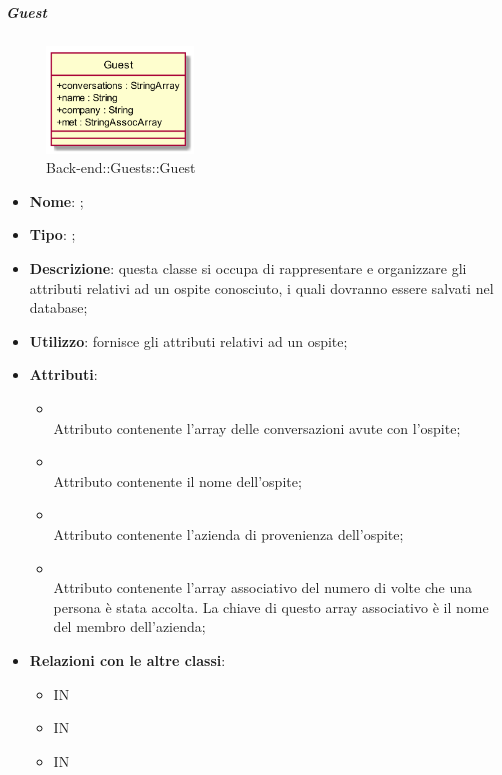 \hypertarget{Guest_label}{\subparagraph{Guest}}
\begin{figure}[h]
	\centering
	\includegraphics[width=0.35\textwidth,height=\textheight,keepaspectratio]{images/ClassGuest.png}
	\caption{Back-end::Guests::Guest}
\end{figure}
\begin{itemize}
	\item \textbf{Nome}: ;
	\item \textbf{Tipo}: ;
	\item \textbf{Descrizione}: questa classe si occupa di rappresentare e organizzare gli attributi relativi ad un ospite conosciuto, i quali dovranno essere salvati nel database;
	\item \textbf{Utilizzo}: fornisce gli attributi relativi ad un ospite;
	\item \textbf{Attributi}:
	\begin{itemize}
		\item[]  \\
		Attributo contenente l'array delle conversazioni avute con l'ospite;
		\item[]  \\
		Attributo contenente il nome dell'ospite;
		\item[]  \\
		Attributo contenente l'azienda di provenienza dell'ospite;
		\item[]  \\
		Attributo contenente l'array associativo del numero di volte che una persona è stata accolta. La chiave di questo array associativo è il nome del membro dell'azienda;
	\end{itemize}
	\item \textbf{Relazioni con le altre classi}:
	\begin{itemize}
		\item IN \hyperlink{<<interface>> GuestsDAO_label}{}
		\item IN \hyperlink{GuestObserver_label}{}
		\item IN \hyperlink{GuestsDAODynamoDB_label}{}
	\end{itemize}
\end{itemize}
\FloatBarrier

